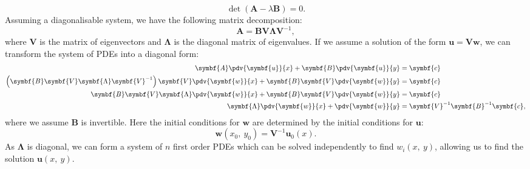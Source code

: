 \documentclass{article}
\theoremstyle{definition}
\begin{document}
\begin{equation*}
    \det{\left( \symbf{A} - \lambda \symbf{B} \right)} = 0.
\end{equation*}
Assuming a diagonalisable system, we have the following matrix
decomposition:
\begin{equation*}
    \symbf{A} = \symbf{B} \symbf{V} \symbf{\Lambda} \symbf{V}^{-1},
\end{equation*}
where \(\symbf{V}\) is the matrix of eigenvectors and \(\symbf{\Lambda}\)
is the diagonal matrix of eigenvalues. If we assume a solution of the
form \(\symbf{u} = \symbf{V} \symbf{w}\), we can transform the system
of PDEs into a diagonal form:
\begin{align*}
    \symbf{A} \pdv{\symbf{u}}{x} + \symbf{B} \pdv{\symbf{u}}{y}                                                                             & = \symbf{c}                                \\
    \left( \symbf{B} \symbf{V} \symbf{\Lambda} \symbf{V}^{-1} \right) \symbf{V} \pdv{\symbf{w}}{x} + \symbf{B} \symbf{V} \pdv{\symbf{w}}{y} & = \symbf{c}                                \\
    \symbf{B} \symbf{V} \symbf{\Lambda} \pdv{\symbf{w}}{x} + \symbf{B} \symbf{V} \pdv{\symbf{w}}{y}                                         & = \symbf{c}                                \\
    \symbf{\Lambda} \pdv{\symbf{w}}{x} + \pdv{\symbf{w}}{y}                                                                                 & = \symbf{V}^{-1} \symbf{B}^{-1} \symbf{c},
\end{align*}
where we assume \(\symbf{B}\) is invertible. Here the initial conditions
for \(\symbf{w}\) are determined by the initial conditions for
\(\symbf{u}\):
\begin{equation*}
    \symbf{w}\left( x_0,\: y_0 \right) = \symbf{V}^{-1} \symbf{u}_0\left( x \right).
\end{equation*}
As \(\symbf{\Lambda}\) is diagonal, we can form a system of \(n\) first
order PDEs which can be solved independently to find \(w_i\left( x,\: y \right)\),
allowing us to find the solution \(\symbf{u}\left( x,\: y \right)\).
\end{document}
